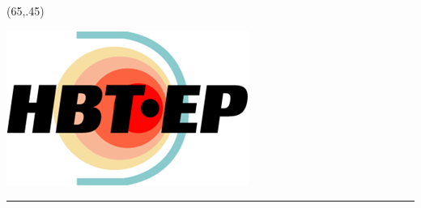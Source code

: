 \documentclass{article}
\begin{document}
\begin{textblock}{1}(65,.45)

\includegraphics[scale =1]{hbt_logo.png}

\end{textblock}


\vspace{100mm}
\hrule{}
\vspace{10mm}


\end{document}
